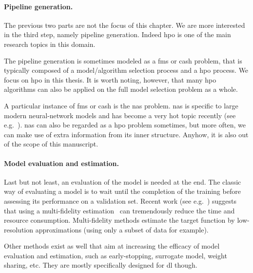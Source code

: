 \paragraph{Pipeline generation.} 
The previous two parts are not the focus of this chapter. We are more interested in the third step, namely pipeline generation. Indeed \gls{hpo} is one of the main research topics in this domain.

The pipeline generation is sometimes modeled as a \gls{fms} or \gls{cash} problem, that is typically composed of a model/algorithm selection process and a \gls{hpo} process. We focus on \gls{hpo} in this thesis. It is worth noting, however, that many \gls{hpo} algorithms can also be applied on the full model selection problem as a whole.

A particular instance of \gls{fms} or \gls{cash} is the \gls{nas} problem. \gls{nas} is specific to large modern neural-network models and has become a very hot topic recently (see e.g.~\citealt{elsken2018nas,zoph2018nas,kandasamy2018nas,liu2019darts}). \gls{nas} can also be regarded as a \gls{hpo} problem sometimes, but more often, we can make use of extra information from its inner structure. Anyhow, it is also out of the scope of this manuscript.

\paragraph{Model evaluation and estimation.}
Last but not least, an evaluation of the model is needed at the end. The classic way of evaluating a model is to wait until the completion of the training before assessing its performance on a validation set. Recent work (see e.g.~\citealt{li2017hyperband}) suggests that using a multi-fidelity estimation~\citep{huang2006multifidelity,wu2019multi-fidelity,peherstorfer2018multifidelity} can tremendously reduce the time and resource consumption. Multi-fidelity methods estimate the target function by low-resolution approximations (using only a subset of data for example).

Other methods exist as well that aim at increasing the efficacy of model evaluation and estimation, such as early-stopping, surrogate model, weight sharing, etc. They are mostly specifically designed for \gls{dl} though.
    

